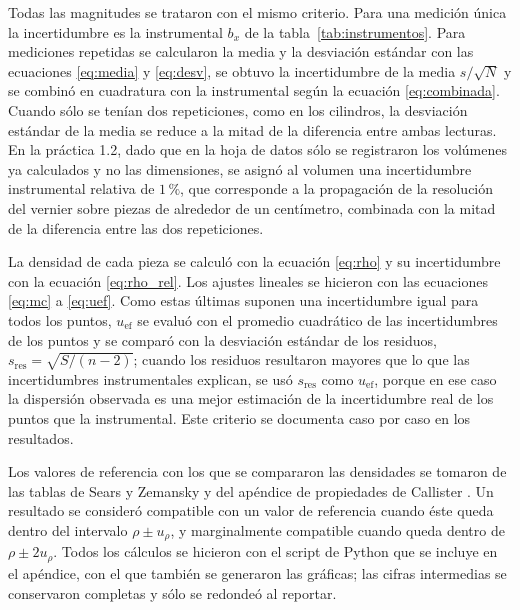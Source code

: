 Todas las magnitudes se trataron con el mismo criterio. Para una medición única la incertidumbre es la instrumental $b_x$ de la tabla~\ref{tab:instrumentos}. Para mediciones repetidas se calcularon la media y la desviación estándar con las ecuaciones \eqref{eq:media} y \eqref{eq:desv}, se obtuvo la incertidumbre de la media $s/\sqrt{N}$ y se combinó en cuadratura con la instrumental según la ecuación \eqref{eq:combinada}. Cuando sólo se tenían dos repeticiones, como en los cilindros, la desviación estándar de la media se reduce a la mitad de la diferencia entre ambas lecturas. En la práctica 1.2, dado que en la hoja de datos sólo se registraron los volúmenes ya calculados y no las dimensiones, se asignó al volumen una incertidumbre instrumental relativa de $1\,\%$, que corresponde a la propagación de la resolución del vernier sobre piezas de alrededor de un centímetro, combinada con la mitad de la diferencia entre las dos repeticiones.

La densidad de cada pieza se calculó con la ecuación \eqref{eq:rho} y su incertidumbre con la ecuación \eqref{eq:rho_rel}. Los ajustes lineales se hicieron con las ecuaciones \eqref{eq:mc} a \eqref{eq:uef}. Como estas últimas suponen una incertidumbre igual para todos los puntos, $u_{\mathrm{ef}}$ se evaluó con el promedio cuadrático de las incertidumbres de los puntos y se comparó con la desviación estándar de los residuos, $s_{\mathrm{res}} = \sqrt{S/(n-2)}$; cuando los residuos resultaron mayores que lo que las incertidumbres instrumentales explican, se usó $s_{\mathrm{res}}$ como $u_{\mathrm{ef}}$, porque en ese caso la dispersión observada es una mejor estimación de la incertidumbre real de los puntos que la instrumental. Este criterio se documenta caso por caso en los resultados.

Los valores de referencia con los que se compararon las densidades se tomaron de las tablas de Sears y Zemansky \cite{sears} y del apéndice de propiedades de Callister \cite{callister}. Un resultado se consideró compatible con un valor de referencia cuando éste queda dentro del intervalo $\rho \pm u_\rho$, y marginalmente compatible cuando queda dentro de $\rho \pm 2u_\rho$. Todos los cálculos se hicieron con el script de Python que se incluye en el apéndice, con el que también se generaron las gráficas; las cifras intermedias se conservaron completas y sólo se redondeó al reportar.
